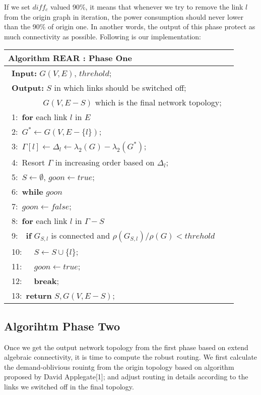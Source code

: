 \documentclass[conference]{IEEEtran}
\begin{document}
If we set $diff_c$ valued 90\%, it means that whenever we try to remove the link $l$ from the origin graph in 
iteration, the power consumption should never lower than the 90\% of origin one. In another words, the output 
of this phase protect as much connectivity as possible. Following is our implementation: 


\begin{table}[!th]
\begin{tabular}{ll}
\hline
\textbf{Algorithm REAR : Phase One}\\
\hline
$\:\:$\textbf{Input:} $G(V, E)$, $threhold$;\\
$\:\:$\textbf{Output:} $S$ in which links should be switched off;\\
$\quad\qquad\quad$ $G(V, E-S)$ which is the final network topology;\\
$\:\:$1:\ \textbf{for} {each link $l$ in $E$}\\
$\:\:$2:\quad\ $G^* \leftarrow G(V, E-\{l\})$;\\
$\:\:$3:\quad\ $\Gamma[l] \leftarrow \Delta_l \leftarrow \lambda_2(G) - \lambda_2(G^*)$;\\
$\:\:$4:\ Resort $\Gamma$ in increasing order based on $\Delta_l$;\\
$\:\:$5:\ $S \leftarrow \emptyset$, $goon \leftarrow true$;\\
$\:\:$6:\ \textbf{while} {$goon$}\\
$\:\:$7:\quad\  $goon \leftarrow false$;\\
$\:\:$8:\quad\ \textbf{for} {each link $l$ in $\Gamma - S$}\\
$\:\:$9:\quad\ \quad\ \textbf{if} $G_{S,l}$ is connected and $\rho(G_{S,l})/\rho(G)<threhold$\\
$\:\:$10:\quad\ \quad\ \quad\ $S \leftarrow S \cup \{l\}$;\\
$\:\:$11:\quad\ \quad\ \quad\ $goon \leftarrow true$;\\
$\:\:$12:\quad\ \quad\ \quad\ \textbf{break};\\
$\:\:$13:\ \textbf{return} $S, G(V, E-S)$;\\
\hline
\end{tabular}
\end{table}



\subsection{Algorihtm Phase Two}
Once we get the output network topology from the first phase based on extend algebraic connectivity, it is time to compute
the robust routing. We first calculate the demand-oblivious rouintg from the origin topology based on algorithm proposed 
by David Applegate[1]; and adjust routing in details according to the links we switched off in the final topology.
\end{document}
